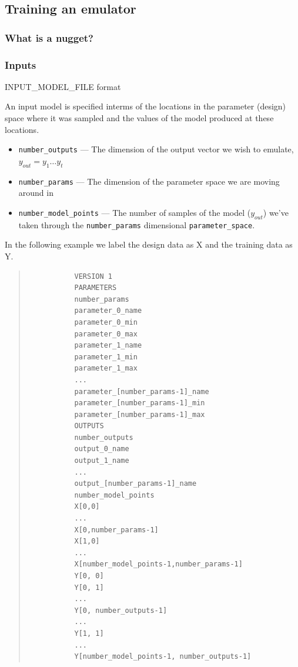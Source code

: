 \documentclass{article}
\begin{document}
\subsection{Training an emulator}

\subsubsection{What is a nugget?}

\subsubsection{Inputs}

INPUT\_MODEL\_FILE format

An input model is specified interms of the locations in the parameter
(design) space where it was sampled and the values of the model
produced at these locations.

\begin{itemize}
\item \texttt{number\_outputs} --- The dimension of the output vector we wish
to emulate, $y_{out} = y_1 \ldots y_t$

\item \texttt{number\_params} --- The dimension of the parameter space we are
moving around in

\item \texttt{number\_model\_points} --- The number of samples of the model
($y_{out}$) we've taken through the \texttt{number\_params} dimensional
\texttt{parameter\_space}.
\end{itemize}

In the following example we label the design data as X and the training
data as Y.
\begin{quote}
\begin{verbatim}
           VERSION 1
           PARAMETERS
           number_params
           parameter_0_name
           parameter_0_min
           parameter_0_max
           parameter_1_name
           parameter_1_min
           parameter_1_max
           ...
           parameter_[number_params-1]_name
           parameter_[number_params-1]_min
           parameter_[number_params-1]_max
           OUTPUTS
           number_outputs
           output_0_name
           output_1_name
           ...
           output_[number_params-1]_name
           number_model_points
           X[0,0]
           ...
           X[0,number_params-1]
           X[1,0]
           ...
           X[number_model_points-1,number_params-1]
           Y[0, 0]
           Y[0, 1]
           ...
           Y[0, number_outputs-1]
           ...
           Y[1, 1]
           ...
           Y[number_model_points-1, number_outputs-1]
\end{verbatim}
\end{quote}
\end{document}

